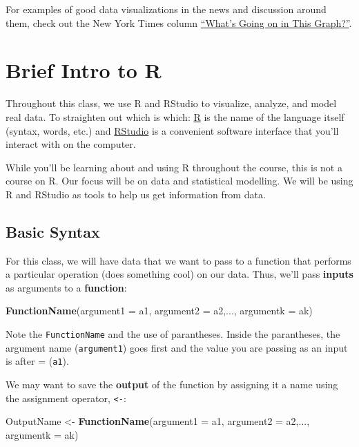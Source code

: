 \documentclass[
]{book}
\newenvironment{Shaded}{\begin{snugshade}}{\end{snugshade}}
\newcommand{\DataTypeTok}[1]{\textcolor[rgb]{0.13,0.29,0.53}{#1}}
\newcommand{\KeywordTok}[1]{\textcolor[rgb]{0.13,0.29,0.53}{\textbf{#1}}}
\newcommand{\NormalTok}[1]{#1}
\newcommand{\StringTok}[1]{\textcolor[rgb]{0.31,0.60,0.02}{#1}}
\begin{document}
For examples of good data visualizations in the news and discussion around them, check out the New York Times column \href{https://www.nytimes.com/column/whats-going-on-in-this-graph}{``What's Going on in This Graph?''}.

\hypertarget{brief-intro-to-r}{%
\section{Brief Intro to R}\label{brief-intro-to-r}}

Throughout this class, we use R and RStudio to visualize, analyze, and model real data. To straighten out which is which: \href{https://cran.r-project.org/}{R} is the name of the language itself (syntax, words, etc.) and \href{https://www.rstudio.com/}{RStudio} is a convenient software interface that you'll interact with on the computer.

While you'll be learning about and using R throughout the course, this is not a course on R. Our focus will be on data and statistical modelling. We will be using R and RStudio as tools to help us get information from data.

\hypertarget{basic-syntax}{%
\subsection{Basic Syntax}\label{basic-syntax}}

For this class, we will have data that we want to pass to a function that performs a particular operation (does something cool) on our data. Thus, we'll pass \textbf{inputs} as arguments to a \textbf{function}:

\begin{Shaded}
\begin{Highlighting}[]
\KeywordTok{FunctionName}\NormalTok{(}\DataTypeTok{argument1 =}\NormalTok{ a1, }\DataTypeTok{argument2 =}\NormalTok{ a2,..., }\DataTypeTok{argumentk =}\NormalTok{ ak)}
\end{Highlighting}
\end{Shaded}

Note the \texttt{FunctionName} and the use of parantheses. Inside the parantheses, the argument name (\texttt{argument1}) goes first and the value you are passing as an input is after = (\texttt{a1}).

We may want to save the \textbf{output} of the function by assigning it a name using the assignment operator, \texttt{\textless{}-}:

\begin{Shaded}
\begin{Highlighting}[]
\NormalTok{OutputName <-}\StringTok{ }\KeywordTok{FunctionName}\NormalTok{(}\DataTypeTok{argument1 =}\NormalTok{ a1, }\DataTypeTok{argument2 =}\NormalTok{ a2,..., }\DataTypeTok{argumentk =}\NormalTok{ ak)}
\end{Highlighting}
\end{Shaded}
\end{document}
